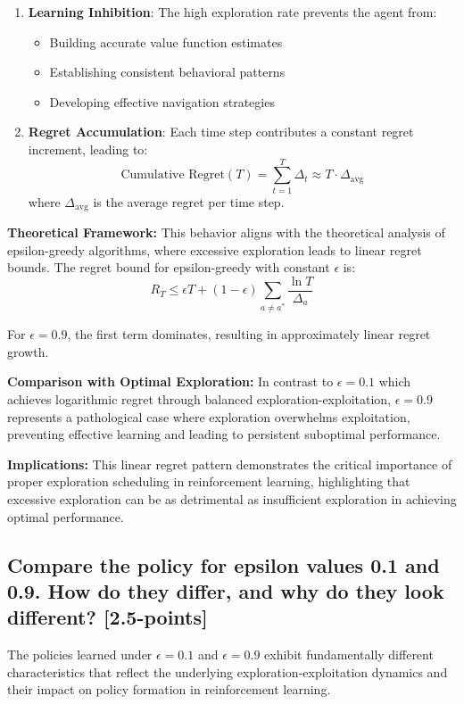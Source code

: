 \documentclass[12pt]{article}
\begin{document}
{{{\begin{enumerate}
    \item \textbf{Learning Inhibition}: The high exploration rate prevents the agent from:
    \begin{itemize}
        \item Building accurate value function estimates
        \item Establishing consistent behavioral patterns
        \item Developing effective navigation strategies
    \end{itemize}
    
    \item \textbf{Regret Accumulation}: Each time step contributes a constant regret increment, leading to:
    $$\text{Cumulative Regret}(T) = \sum_{t=1}^{T} \Delta_t \approx T \cdot \Delta_{\text{avg}}$$
    where $\Delta_{\text{avg}}$ is the average regret per time step.
\end{enumerate}

\textbf{Theoretical Framework:}
This behavior aligns with the theoretical analysis of epsilon-greedy algorithms, where excessive exploration leads to linear regret bounds. The regret bound for epsilon-greedy with constant $\epsilon$ is:
$$R_T \leq \epsilon T + (1-\epsilon) \sum_{a \neq a^*} \frac{\ln T}{\Delta_a}$$

For $\epsilon = 0.9$, the first term dominates, resulting in approximately linear regret growth.

\textbf{Comparison with Optimal Exploration:}
In contrast to $\epsilon = 0.1$ which achieves logarithmic regret through balanced exploration-exploitation, $\epsilon = 0.9$ represents a pathological case where exploration overwhelms exploitation, preventing effective learning and leading to persistent suboptimal performance.

\textbf{Implications:}
This linear regret pattern demonstrates the critical importance of proper exploration scheduling in reinforcement learning, highlighting that excessive exploration can be as detrimental as insufficient exploration in achieving optimal performance.

\subsection{Compare the policy for epsilon values 0.1 and 0.9. How do they differ, and why do they look different? [2.5-points]}

The policies learned under $\epsilon = 0.1$ and $\epsilon = 0.9$ exhibit fundamentally different characteristics that reflect the underlying exploration-exploitation dynamics and their impact on policy formation in reinforcement learning.

}}}
\end{document}
